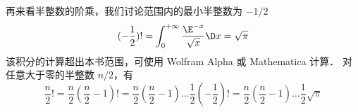 再来看半整数的阶乘，我们讨论范围内的最小半整数为 $-1/2$ 
\begin{equation}
(-\frac 12) ! = \int_0^{ + \infty } {\frac{\E^{ - x}}{\sqrt x }\D x} = \sqrt{\pi}
\end{equation}
该积分的计算超出本书范围，可使用 Wolfram Alpha 或 Mathematica 计算．%
对任意大于零的半整数 $n/2$，有
\begin{equation}
\frac{n}{2}! = \frac{n}{2} \left(\frac{n}{2}-1 \right)! = \frac{n}{2} \left(\frac{n}{2}-1\right) \dots \frac 12 \left(-\frac 12\right) ! = \frac{n}{2} \left(\frac{n}{2}-1\right) \dots \frac 12 \sqrt{\pi}
\end{equation}















